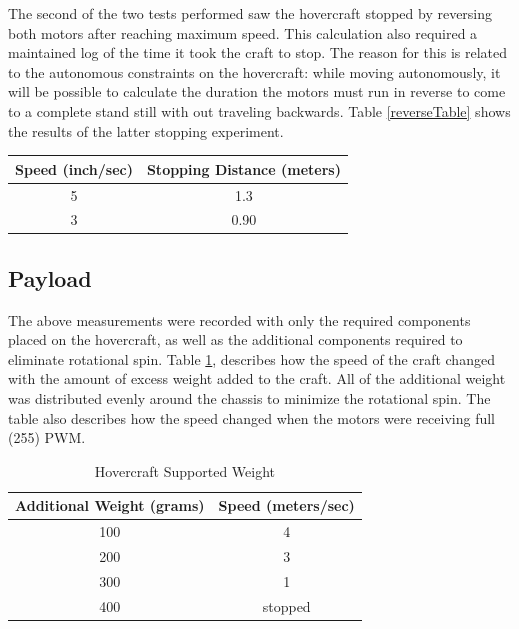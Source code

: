 The second of the two tests performed saw the hovercraft stopped by reversing both motors after reaching maximum speed.  This calculation  also required a maintained log of the time it took the craft to stop. The reason for this is related to the autonomous constraints on the hovercraft: while moving autonomously, it will be possible to calculate the duration the motors must run in reverse to come to a complete stand still with out traveling backwards.  Table \ref{reverseTable} shows the results of the latter stopping experiment. 

\begin{minipage}{6.5in}
\begin{center}
\begin{tabular}{ c c }
  Speed (inch/sec) & Stopping Distance (meters) \\
  \hline
  5 & 1.3 \\
  3 & 0.90 \\
\end{tabular}
\end{center}
\label{reverseTable}
\end{minipage}

\subsection{Payload}
The above measurements were recorded with only the required components placed on the hovercraft, as well as the additional components required to eliminate rotational spin. Table \ref{weightTable}, describes how the speed of the craft changed with the amount of excess weight added to the craft. All of the additional weight was distributed evenly around the chassis to minimize the rotational spin. The table also describes how the speed changed when the motors were receiving full (255) PWM.
\begin{table}
\caption{Hovercraft Supported Weight}
\begin{center}
\begin{tabular}{ c c }
  Additional Weight (grams) & Speed (meters/sec) \\
  \hline
  100 & 4 \\
  200 & 3 \\
  300 & 1 \\
  400 & stopped \\
\end{tabular}
\end{center}
\label{weightTable}
\end{table}

